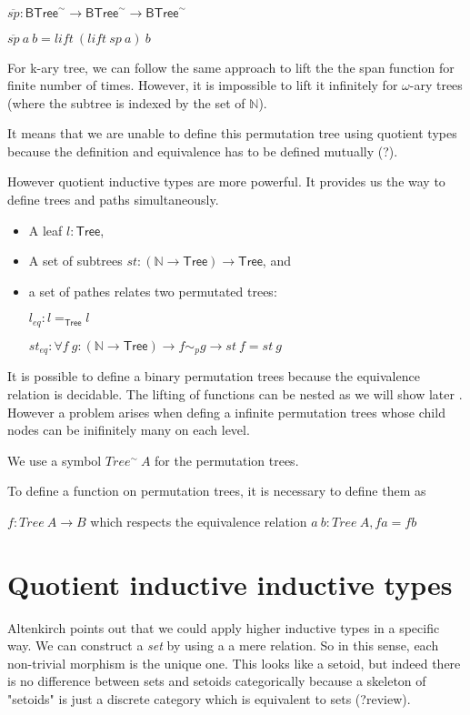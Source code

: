 $\overline{sp} : \mathsf{BTree}^{\sim} \rightarrow \mathsf{BTree}^{\sim} \rightarrow \mathsf{BTree}^{\sim}$

$\overline{sp}~a~b = lift~(lift~sp~a)~b$


For k-ary tree, we can follow the same approach to lift the the span
function for finite number of times. However, it is impossible to lift
it infinitely for $\omega$-ary trees (where the subtree is indexed by
the set of $\mathbb{N}$).

It means that we are unable to define this permutation tree using
quotient types because the definition and equivalence has to be
defined mutually (?).

However quotient inductive types are more powerful. It provides us the
way to define trees and paths simultaneously.

\begin{itemize}
\item A leaf $l: \mathsf{Tree}$, 
\item A set of subtrees $st : (\mathbb{N} \rightarrow \mathsf{Tree}) \rightarrow \mathsf{Tree}$,
  and
\item a set of pathes relates two permutated trees:

$l_{eq} : l  =_{\mathsf{Tree}} l $

$st_{eq} : \forall f~g : (\mathbb{N} \rightarrow \mathsf{Tree}) \rightarrow
f \sim_{p} g \rightarrow  st~f = st~g$
\end{itemize}

It is possible to define a binary permutation trees because the
equivalence relation is decidable. The lifting of functions can be
nested as we will show later \todo{}.
However a problem arises when defing a infinite permutation trees
whose child nodes can be inifinitely many on each level.

We use a symbol $Tree^{\sim}~A$ for the permutation trees.

To define a function on permutation trees, it is necessary to define
them as

$f : Tree~A \rightarrow B$ which respects the equivalence relation
$a~b : Tree~A, f a = f b$

\section{Quotient inductive inductive types}

Altenkirch points out that we could apply higher inductive types in a
specific way. We can construct a \emph{set} by using a a mere
relation. So in this sense, each non-trivial morphism is the unique
one. This looks like a setoid, but indeed there is no difference
between sets and setoids categorically because a skeleton of "setoids"
is just a discrete category which is equivalent to sets (?review).


